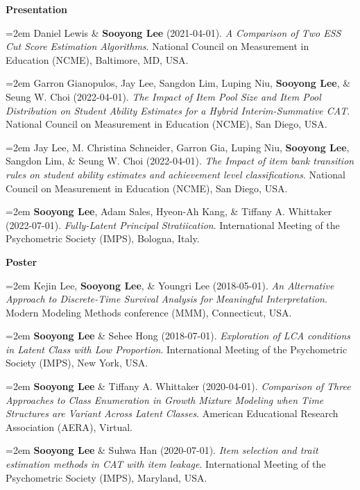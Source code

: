 \documentclass[11pt,letterpaper,]{awesome-me}
\begin{document}
\setlength{\leftskip}{0cm}

\textbf{Presentation}

\setlength{\leftskip}{0.5cm}

\hangindent=2em  Daniel Lewis \& \textbf{Sooyong Lee}
(2021-04-01). \emph{A Comparison of Two ESS Cut Score Estimation
Algorithms}. National Council on Measurement in Education (NCME),
Baltimore, MD, USA.

\hangindent=2em  Garron Gianopulos, Jay Lee, Sangdon Lim,
Luping Niu, \textbf{Sooyong Lee}, \& Seung W. Choi (2022-04-01).
\emph{The Impact of Item Pool Size and Item Pool Distribution on Student
Ability Estimates for a Hybrid Interim-Summative CAT}. National Council
on Measurement in Education (NCME), San Diego, USA.

\hangindent=2em  Jay Lee, M. Christina Schneider, Garron
Gia, Luping Niu, \textbf{Sooyong Lee}, Sangdon Lim, \& Seung W. Choi
(2022-04-01). \emph{The Impact of item bank transition rules on student
ability estimates and achievement level classifications}. National
Council on Measurement in Education (NCME), San Diego, USA.

\hangindent=2em  \textbf{Sooyong Lee}, Adam Sales, Hyeon-Ah
Kang, \& Tiffany A. Whittaker (2022-07-01). \emph{Fully-Latent Principal
Stratiication}. International Meeting of the Psychometric Society
(IMPS), Bologna, Italy.

\setlength{\leftskip}{0cm}

\textbf{Poster}

\setlength{\leftskip}{0.5cm}

\hangindent=2em  Kejin Lee, \textbf{Sooyong Lee}, \& Youngri
Lee (2018-05-01). \emph{An Alternative Approach to Discrete-Time
Survival Analysis for Meaningful Interpretation}. Modern Modeling
Methods conference (MMM), Connecticut, USA.

\hangindent=2em  \textbf{Sooyong Lee} \& Sehee Hong
(2018-07-01). \emph{Exploration of LCA conditions in Latent Class with
Low Proportion}. International Meeting of the Psychometric Society
(IMPS), New York, USA.

\hangindent=2em  \textbf{Sooyong Lee} \& Tiffany A.
Whittaker (2020-04-01). \emph{Comparison of Three Approaches to Class
Enumeration in Growth Mixture Modeling when Time Structures are Variant
Across Latent Classes}. American Educational Research Association
(AERA), Virtual.

\hangindent=2em  \textbf{Sooyong Lee} \& Suhwa Han
(2020-07-01). \emph{Item selection and trait estimation methods in CAT
with item leakage}. International Meeting of the Psychometric Society
(IMPS), Maryland, USA.
\end{document}
